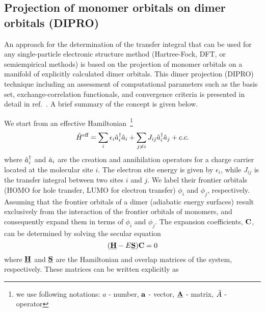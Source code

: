 \subsection{Projection of monomer orbitals on dimer orbitals (DIPRO)}
\label{sec:dipro}
An approach for the determination of the transfer integral that can be used for 
any single-particle electronic structure method (Hartree-Fock, DFT, or 
semiempirical methods) is based on the projection of monomer orbitals on a 
manifold of explicitly calculated dimer orbitals. This dimer projection (DIPRO) 
technique including an assessment of computational parameters such as the basis 
set, exchange-correlation functionals, and convergence criteria is presented in 
detail in ref.~\cite{baumeier_density-functional_2010}. A brief summary of the 
concept is given below.

We start from an effective Hamiltonian~\footnote{we use following notations: $a$ 
- number, ${\mathbf{a}}$ - vector, $\underline{\mathbf{A}}$ - matrix, $\hat{A}$ - operator}
%
\begin{equation}
  \hat{H}^\text{eff} = \sum_i \epsilon_i \hat{a}_i^\dagger \hat{a}_i + 
\sum_{j \neq i} J_{ij} \hat{a}_i^\dagger \hat{a}_j + c.c.
  \label{equ:dipro_eq1}
\end{equation}
%
where $\hat{a}_i^\dagger$ and $\hat{a}_i$ are the creation and annihilation 
operators for a charge carrier located at the molecular site $i$.
The electron site energy is given by $\epsilon_i$, while $J_{ij}$  is the 
transfer integral between two sites $i$ and $j$. We label their frontier 
orbitals (HOMO for hole transfer, LUMO for electron transfer) $\phi_i$ and 
$\phi_j$, respectively. Assuming that the frontier orbitals of a dimer 
(adiabatic energy surfaces) result exclusively from the interaction of the 
frontier orbitals of monomers, and consequently expand them in terms of $\phi_i$ 
and $\phi_j$. The expansion coefficients, ${\mathbf{C}}$, can be determined by 
solving the secular equation
%
\begin{equation}
  (\underline{\mathbf{H}} - E \underline{\mathbf{S}}){\mathbf{C}} = 0
  \label{equ:dipro_eq2}
\end{equation}
%
where $\underline{\mathbf{H}}$ and $\underline{\mathbf{S}}$ are the Hamiltonian and overlap matrices of the 
system, respectively. 
%
%
%
These matrices can be written explicitly as
